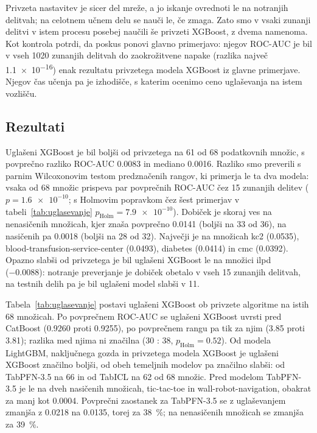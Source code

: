 \documentclass[a4paper,12pt,openright]{book}
\begin{document}
Privzeta nastavitev je sicer del mreže, a jo iskanje ovrednoti le na notranjih
delitvah; na celotnem učnem delu se nauči le, če zmaga. Zato smo v vsaki zunanji
delitvi v istem procesu posebej naučili še privzeti XGBoost, z dvema namenoma.
Kot kontrola potrdi, da poskus ponovi glavno primerjavo: njegov ROC-AUC je bil v
vseh 1020 zunanjih delitvah do zaokrožitvene napake (razlika največ
\num{1.1e-16}) enak rezultatu privzetega modela XGBoost iz glavne primerjave.
Njegov čas učenja pa je izhodišče, s katerim ocenimo ceno uglaševanja na istem
vozlišču.

\subsection{Rezultati}

Uglašeni XGBoost je bil boljši od privzetega na 61 od 68 podatkovnih množic,
s povprečno razliko ROC-AUC \num{0.0083} in mediano \num{0.0016}. Razliko smo
preverili s parnim Wilcoxonovim testom predznačenih rangov, ki primerja le ta
dva modela: vsaka od 68 množic prispeva par povprečnih ROC-AUC čez 15 zunanjih
delitev ($p = \num{1.6e-10}$; s Holmovim popravkom čez šest primerjav v
tabeli~\ref{tab:uglasevanje} $p_\mathrm{Holm} = \num{7.9e-10}$).
Dobiček je skoraj ves na nenasičenih množicah, kjer znaša
povprečno \num{0.0141} (boljši na 33 od 36), na nasičenih pa \num{0.0018} (boljši
na 28 od 32). Največji je na množicah kc2 (\num{0.0535}),
blood-transfusion-service-center (\num{0.0493}), diabetes (\num{0.0414}) in cmc
(\num{0.0392}). Opazno slabši od privzetega je bil uglašeni XGBoost le na
množici ilpd (\num{-0.0088}): notranje preverjanje je dobiček obetalo v vseh 15
zunanjih delitvah, na testnih delih pa je bil uglašeni model slabši v 11.

Tabela~\ref{tab:uglasevanje} postavi uglašeni XGBoost ob privzete algoritme na
istih 68 množicah. Po povprečnem ROC-AUC se uglašeni XGBoost uvrsti pred
CatBoost (\num{0.9260} proti \num{0.9255}), po povprečnem rangu pa tik za njim
(\num{3.85} proti \num{3.81}); razlika med njima ni značilna (30 : 38,
$p_\mathrm{Holm} = \num{0.52}$). Od modela LightGBM, naključnega gozda in
privzetega modela XGBoost je uglašeni XGBoost značilno boljši, od obeh
temeljnih modelov pa značilno slabši: od TabPFN-3.5 na 66 in od TabICL na 62 od
68 množic. Pred modelom TabPFN-3.5 je le na dveh nasičenih množicah,
tic-tac-toe in wall-robot-navigation, obakrat za manj kot \num{0.0004}.
Povprečni zaostanek za TabPFN-3.5 se z uglaševanjem zmanjša z \num{0.0218} na
\num{0.0135}, torej za \SI{38}{\percent}; na nenasičenih množicah se zmanjša za
\SI{39}{\percent}.
\end{document}
